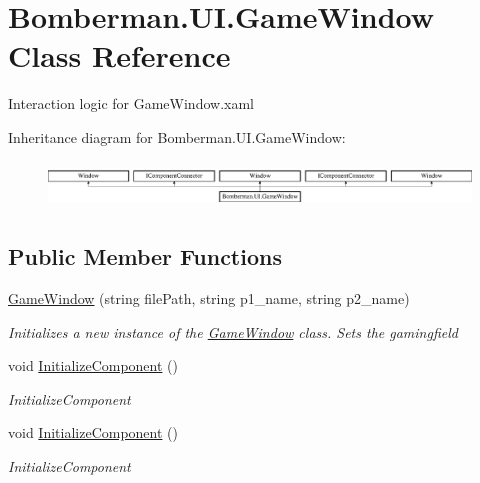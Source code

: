 \hypertarget{class_bomberman_1_1_u_i_1_1_game_window}{}\section{Bomberman.\+U\+I.\+Game\+Window Class Reference}
\label{class_bomberman_1_1_u_i_1_1_game_window}


Interaction logic for Game\+Window.\+xaml  


Inheritance diagram for Bomberman.\+U\+I.\+Game\+Window\+:\begin{figure}[H]
\begin{center}
\leavevmode
\includegraphics[height=1.237569cm]{class_bomberman_1_1_u_i_1_1_game_window}
\end{center}
\end{figure}
\subsection*{Public Member Functions}
\begin{DoxyCompactItemize}
\item 
\mbox{\hyperlink{class_bomberman_1_1_u_i_1_1_game_window_aa424bf59af30c6903af202f0aa6ef123}{Game\+Window}} (string file\+Path, string p1\+\_\+name, string p2\+\_\+name)
\begin{DoxyCompactList}\small\item\em Initializes a new instance of the \mbox{\hyperlink{class_bomberman_1_1_u_i_1_1_game_window}{Game\+Window}} class. Sets the gamingfield \end{DoxyCompactList}\item 
void \mbox{\hyperlink{class_bomberman_1_1_u_i_1_1_game_window_a8a7ee739b5c6cc202006ab127e280afd}{Initialize\+Component}} ()
\begin{DoxyCompactList}\small\item\em Initialize\+Component \end{DoxyCompactList}\item 
void \mbox{\hyperlink{class_bomberman_1_1_u_i_1_1_game_window_a8a7ee739b5c6cc202006ab127e280afd}{Initialize\+Component}} ()
\begin{DoxyCompactList}\small\item\em Initialize\+Component \end{DoxyCompactList}\end{DoxyCompactItemize}
